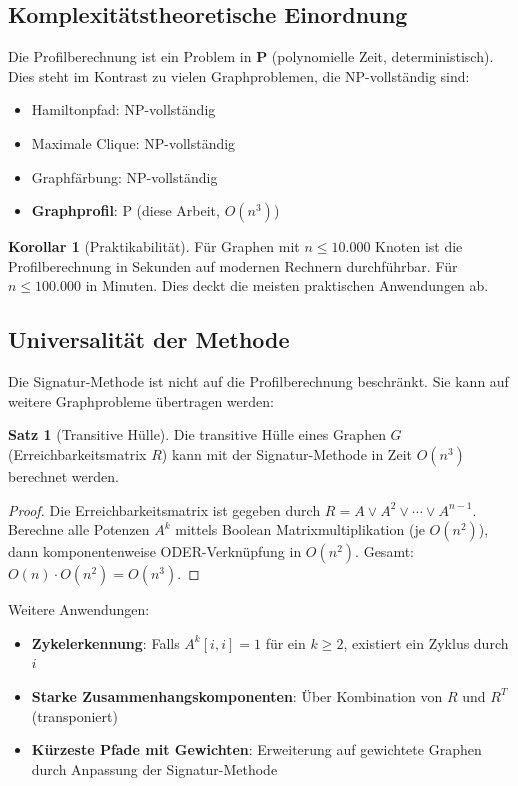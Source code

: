 ﻿\documentclass[a4paper,12pt]{article}
\theoremstyle{definition}
\newtheorem{satz}{Satz}
\newtheorem{korollar}{Korollar}
\begin{document}
	\subsection{Komplexitätstheoretische Einordnung}
	
	Die Profilberechnung ist ein Problem in \textbf{P} (polynomielle Zeit, deterministisch). Dies steht im Kontrast zu vielen Graphproblemen, die NP-vollständig sind:
	
	\begin{itemize}
		\item[-] Hamiltonpfad: NP-vollständig
		\item[-] Maximale Clique: NP-vollständig
		\item[-] Graphfärbung: NP-vollständig
		\item[-] \textbf{Graphprofil}: P (diese Arbeit, $O(n^3)$)
	\end{itemize}
	
	\begin{korollar}[Praktikabilität]
		Für Graphen mit $n \leq 10.000$ Knoten ist die Profilberechnung in Sekunden auf modernen Rechnern durchführbar. Für $n \leq 100.000$ in Minuten. Dies deckt die meisten praktischen Anwendungen ab.
	\end{korollar}
	
	\subsection{Universalität der Methode}
	
	Die Signatur-Methode ist nicht auf die Profilberechnung beschränkt. Sie kann auf weitere Graphprobleme übertragen werden:
	
	\begin{satz}[Transitive Hülle]
		Die transitive Hülle eines Graphen $G$ (Erreichbarkeitsmatrix $R$) kann mit der Signatur-Methode in Zeit $O(n^3)$ berechnet werden.
	\end{satz}
	
	\begin{proof}
		Die Erreichbarkeitsmatrix ist gegeben durch $R = A \vee A^2 \vee \cdots \vee A^{n-1}$. Berechne alle Potenzen $A^k$ mittels Boolean Matrixmultiplikation (je $O(n^2)$), dann komponentenweise ODER-Verknüpfung in $O(n^2)$. Gesamt: $O(n) \cdot O(n^2) = O(n^3)$.
	\end{proof}
	
	Weitere Anwendungen:
	\begin{itemize}
		\item[-] \textbf{Zykelerkennung}: Falls $A^k[i,i] = 1$ für ein $k \geq 2$, existiert ein Zyklus durch $i$
		\item[-] \textbf{Starke Zusammenhangskomponenten}: Über Kombination von $R$ und $R^T$ (transponiert)
		\item[-] \textbf{Kürzeste Pfade mit Gewichten}: Erweiterung auf gewichtete Graphen durch Anpassung der Signatur-Methode
	\end{itemize}
	
\end{document}
